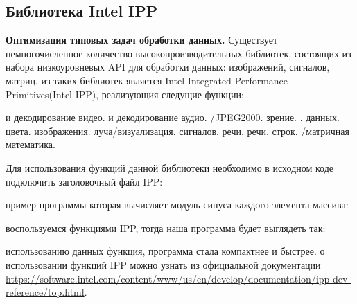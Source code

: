 { %
	\subsection{Библиотека Intel IPP}
	\label{IPP:section}
	\par\textbf{Оптимизация типовых задач обработки данных.} Существует немногочисленное количество высокопроизводительных библиотек, состоящих из набора низкоуровневых API для обработки данных: изображений, сигналов, матриц.
	 из таких библиотек является Intel Integrated Performance Primitives(Intel IPP), реализующия следущие функции:
	\begin{itemize}
		 и декодирование видео.
		 и декодирование аудио.
		\itemJPEG/JPEG2000.
		 зрение.
		.
		 данных.
		 цвета.
		 изображения.
		 луча/визуализация.
		 сигналов.
		 речи.
		 речи.
		 строк.
		/матричная математика.
	\end{itemize}
	Для использования функций данной библиотеки необходимо в исходном коде подключить заголовочный файл IPP:
	\begin{figure}[H]
		
	\end{figure}
	 пример программы которая вычисляет модуль синуса каждого элемента массива:
	\begin{figure}[H]
		
	\end{figure}
	 воспользуемся функциями IPP, тогда наша программа будет выглядеть так:
	\begin{figure}[H]
		
	\end{figure}
     использованию данных функция, программа стала компактнее и быстрее.
     о использовании функций IPP можно узнать из официальной документации \url{https://software.intel.com/content/www/us/en/develop/documentation/ipp-dev-reference/top.html}.
    \par
}